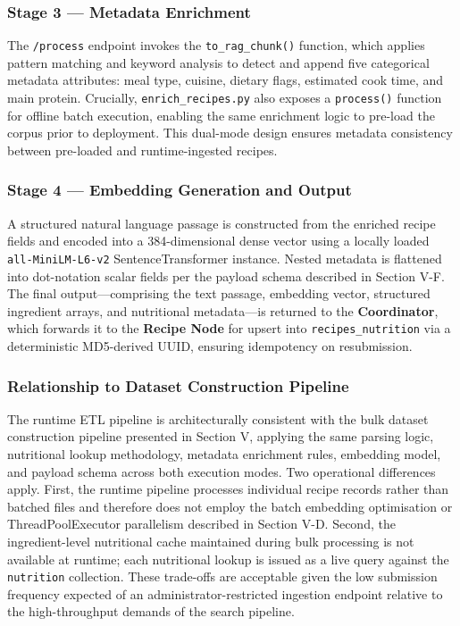 \documentclass[conference]{IEEEtran}
\begin{document}
\subsubsection{Stage 3 — Metadata Enrichment}
The \texttt{/process} endpoint invokes the \texttt{to\_rag\_chunk()} function, which applies pattern matching and keyword analysis to detect and append five categorical metadata attributes: meal type, cuisine, dietary flags, estimated cook time, and main protein. Crucially, \texttt{enrich\_recipes.py} also exposes a \texttt{process()} function for offline batch execution, enabling the same enrichment logic to pre-load the corpus prior to deployment. This dual-mode design ensures metadata consistency between pre-loaded and runtime-ingested recipes.

\subsubsection{Stage 4 — Embedding Generation and Output}
A structured natural language passage is constructed from the enriched recipe fields and encoded into a 384-dimensional dense vector using a locally loaded \texttt{all-MiniLM-L6-v2} SentenceTransformer instance. Nested metadata is flattened into dot-notation scalar fields per the payload schema described in Section V-F. The final output---comprising the text passage, embedding vector, structured ingredient arrays, and nutritional metadata---is returned to the \textbf{Coordinator}, which forwards it to the \textbf{Recipe Node} for upsert into \texttt{recipes\_nutrition} via a deterministic MD5-derived UUID, ensuring idempotency on resubmission.

\subsubsection{Relationship to Dataset Construction Pipeline}
The runtime ETL pipeline is architecturally consistent with the bulk dataset construction pipeline presented in Section V, applying the same parsing logic, nutritional lookup methodology, metadata enrichment rules, embedding model, and payload schema across both execution modes. Two operational differences apply. First, the runtime pipeline processes individual recipe records rather than batched files and therefore does not employ the batch embedding optimisation or ThreadPoolExecutor parallelism described in Section V-D. Second, the ingredient-level nutritional cache maintained during bulk processing is not available at runtime; each nutritional lookup is issued as a live query against the \texttt{nutrition} collection. These trade-offs are acceptable given the low submission frequency expected of an administrator-restricted ingestion endpoint relative to the high-throughput demands of the search pipeline.
\end{document}
